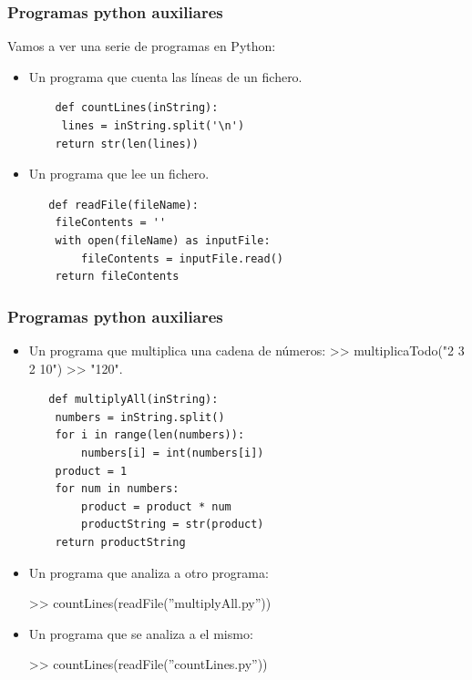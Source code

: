 \documentclass[xcolor=table]{beamer}
\begin{document}
\begin{frame} [fragile] \frametitle{Programas python auxiliares} \scriptsize  

Vamos a ver una serie de programas en Python:

\begin{itemize}
    \item Un programa que cuenta las líneas de un fichero.

    \begin{verbatim}
    def countLines(inString):          
     lines = inString.split('\n')
    return str(len(lines))         
    \end{verbatim}

  \item Un programa que lee un fichero.
  \begin{verbatim}
   def readFile(fileName):
    fileContents = ''
    with open(fileName) as inputFile:
        fileContents = inputFile.read()
    return fileContents
\end{verbatim}


\end{itemize}

\end{frame} 
\begin{frame} [fragile] \frametitle{Programas python auxiliares}\scriptsize  


\begin{itemize}
  
  \item Un programa que multiplica una cadena de números:  >> multiplicaTodo("2 3 2 10") >> "120".
  
    \begin{verbatim}
   def multiplyAll(inString): 
    numbers = inString.split()  
    for i in range(len(numbers)):  
        numbers[i] = int(numbers[i]) 
    product = 1  
    for num in numbers: 
        product = product * num   
        productString = str(product) 
    return productString 
    \end{verbatim}

\end{itemize}

\begin{itemize}
    \item Un programa que analiza a otro programa:

 >>  countLines(readFile(''multiplyAll.py''))

    \item Un programa que se analiza a el mismo:
    
    >>  countLines(readFile(''countLines.py''))

\end{itemize}

\end{frame} 
\end{document}
